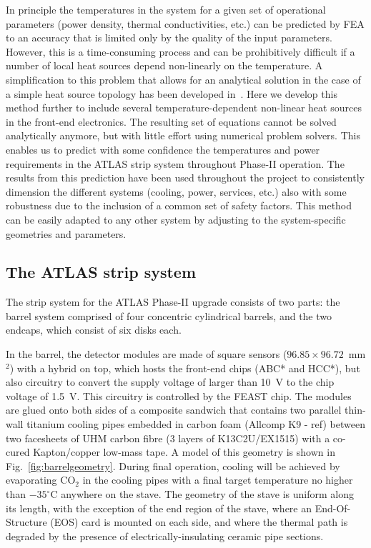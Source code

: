 In principle the temperatures in the system for a given set of operational parameters (power density, thermal conductivities, etc.) can be predicted by FEA to an accuracy that is limited only by the quality of the input parameters. However, this is a time-consuming process and can be prohibitively difficult if a number of local heat sources depend non-linearly on the temperature. A simplification to this problem that allows for an analytical solution in the case of a simple heat source topology has been developed in~\cite{Beck:2010zzd}. Here we develop this method further to include several temperature-dependent non-linear heat sources in the front-end electronics. The resulting set of equations cannot be solved analytically anymore, but with little effort using numerical problem solvers. This enables us to predict with some confidence the temperatures and power requirements in the ATLAS strip system throughout Phase-II operation. The results from this prediction have been used throughout the project to consistently dimension the different systems (cooling, power, services, etc.) also with some robustness due to the inclusion of a common set of safety factors. This method can be easily adapted to any other system by adjusting to the system-specific geometries and parameters.

\subsection{The ATLAS strip system}
The strip system for the ATLAS Phase-II upgrade \cite{Collaboration:2017mtb} consists of two parts: the barrel system comprised of four concentric cylindrical barrels, and the two endcaps, which consist of six disks each.

In the barrel, the detector modules are made of square sensors ($96.85\times 96.72$~mm$^2$) with a hybrid on top, which hosts the front-end chips (ABC* and HCC*), but also circuitry to convert the supply voltage of larger than 10~V to the chip voltage of 1.5~V. This circuitry is controlled by the FEAST chip. The modules are glued onto both sides of a composite sandwich that contains two parallel thin-wall titanium cooling pipes embedded in carbon foam (Allcomp K9 - ref)  between two facesheets of UHM carbon fibre (3 layers of K13C2U/EX1515) with a co-cured Kapton/copper low-mass tape. A model of this geometry is shown in Fig.~\ref{fig:barrelgeometry}. During final operation, cooling will be achieved by evaporating CO$_2$ in the cooling pipes with a final target temperature no higher than $-35^\circ$C anywhere on the stave. The geometry of the stave is uniform along its length, with the exception of the end region of the stave, where an End-Of-Structure (EOS) card is mounted on each side, and where the thermal path is degraded by the presence of electrically-insulating ceramic pipe sections. 

